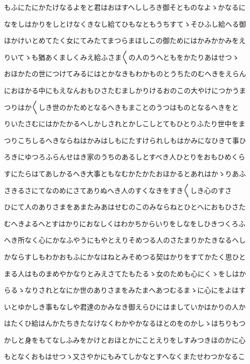 \documentclass[a4paper,11pt,landscape]{ltjtarticle}
\begin{document}
もふにたにかたけなるよをと君はおほすへししろき御そとものなよゝかなるに
\par\medskip
なをしはかりをしとけなくきなし給てひもなともうちすてゝそひふし給へる御
\par\medskip
ほかけいとめてたく女にてみたてまつらまほしこの御ためにはかみかかみをえ
\par\medskip
りいてゝも猶あくましくみえ給ふさま〱の人のうへともをかたりあはせつゝ
\par\medskip
おほかたの世につけてみるにはとかなきもわかものとうちたのむへきをえらん
\par\medskip
におほかる中にもえなんおもひさたむましかりけるおのこの大やけにつかうま
\par\medskip
つりはか〱しき世のかためとなるへきもまことのうつはものとなるへきをと
\par\medskip
りいたさむにはかたかるへしかしされとかしこしとてもひとりふたり世中をま
\par\medskip
つりこちしるへきならねはかみはしもにたすけられしもはかみになひきて事ひ
\par\medskip
ろきにゆつろふらんせはき家のうちのあるしとすべき人ひとりをおもひめくら
\par\medskip
すにたらはてあしかるへき大事ともなむかたかたおほかるとあれはかゝりあふ
\par\medskip
さきるさにてなのめにさてありぬへき人のすくなきをすき〱しき心のすさ
\par\medskip
ひにて人のありさまをあまたみあはせむのこのみならねとひとへにおもひさた
\par\medskip
むへきよるへとすはかりにおなしくはわかちからいりをしなをしひきつくろふ
\par\medskip
へき所なく心にかなふやうにもやとえりそめつる人のさたまりかたきなるへし
\par\medskip
かならすしもわかおもふにかなはねとみそめつる契はかりをすてかたく思ひと
\par\medskip
まる人はものまめやかなりとみえさてたもたるゝ女のためも心にくゝをしはか
\par\medskip
らるゝなりされとなにか世のありさまをみたまへあつむるまゝに心にをよはす
\par\medskip
いとゆかしき事もなしや君達のかみなき御えらひにはましていかはかりの人か
\par\medskip
はたくひ給はんかたちきたなけなくわかやかなるほとのをのかしゝはちりもつ
\par\medskip
かしと身をもてなしふみをかけとおほとかにことえりをしすみつきほのかに心
\par\medskip
もとなくおもはせつゝ又さやかにもみてしかなとすへなくまたせわつかなるこ
\end{document}
